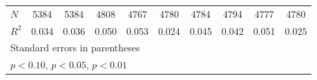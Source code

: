 \begin{table}[htbp]
\begin{tabular}{l*{9}{c}}
\(N\)       &        5384         &        5384         &        4808         &        4767         &        4780         &        4784         &        4794         &        4777         &        4780         \\
\(R^{2}\)   &       0.034         &       0.036         &       0.050         &       0.053         &       0.024         &       0.045         &       0.042         &       0.051         &       0.025         \\
\hline\hline
\multicolumn{10}{l}{\footnotesize Standard errors in parentheses}\\
\multicolumn{10}{l}{\footnotesize \sym{*} \(p<0.10\), \sym{**} \(p<0.05\), \sym{***} \(p<0.01\)}\\
\end{tabular}
\end{table}
